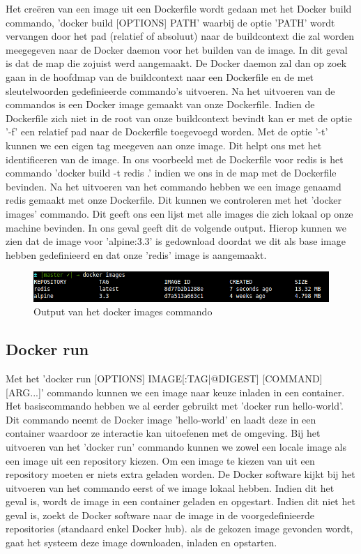Het creëren van een image uit een Dockerfile wordt gedaan met het Docker build commando, 'docker build [OPTIONS] PATH' waarbij de optie 'PATH' wordt vervangen door het pad (relatief of absoluut) naar de buildcontext die zal worden meegegeven naar de Docker daemon voor het builden van de image. In dit geval is dat de map die zojuist werd aangemaakt. De Docker daemon zal dan op zoek gaan in de hoofdmap van de buildcontext naar een Dockerfile en de met sleutelwoorden gedefinieerde commando's uitvoeren. Na het uitvoeren van de commandos is een Docker image gemaakt van onze Dockerfile. Indien de Dockerfile zich niet in de root van onze buildcontext bevindt kan er met de optie '-f' een relatief pad naar de Dockerfile toegevoegd worden. Met de optie '-t' kunnen we een eigen tag meegeven aan onze image. Dit helpt ons met het identificeren van de image. In ons voorbeeld met de Dockerfile voor redis is het commando 'docker build -t redis .' indien we ons in de map met de Dockerfile bevinden. Na het uitvoeren van het commando hebben we een image genaamd redis gemaakt met onze Dockerfile. Dit kunnen we controleren met het 'docker images' commando. Dit geeft ons een lijst met alle images die zich lokaal op onze machine bevinden. In ons geval geeft dit de volgende output. Hierop kunnen we zien dat de image voor 'alpine:3.3' is gedownload doordat we dit als base image hebben gedefinieerd en dat onze 'redis' image is aangemaakt.


\begin{figure}[!ht]
	\centering
	\includegraphics[scale=0.55]{img/dockerImages.png}
	\caption{Output van het docker images commando}
\end{figure}



\subsection{Docker run}

Met het 'docker run [OPTIONS] IMAGE[:TAG|@DIGEST] [COMMAND] [ARG...]' commando kunnen we een image naar keuze inladen in een container. Het basiscommando hebben we al eerder gebruikt met 'docker run hello-world'. Dit commando neemt de Docker image 'hello-world' en laadt deze in een container waardoor ze interactie kan uitoefenen met de omgeving. Bij het uitvoeren van het 'docker run' commando kunnen we zowel een locale image als een image uit een repository kiezen. Om een image te kiezen van uit een repository moeten er niets extra geladen worden. De Docker software kijkt bij het uitvoeren van het commando eerst of we image lokaal hebben. Indien dit het geval is, wordt de image in een container geladen en opgestart. Indien dit niet het geval is, zoekt de Docker software naar de image in de voorgedefinieerde repositories (standaard enkel Docker hub). als de gekozen image gevonden wordt, gaat het systeem deze image downloaden, inladen en opstarten.

